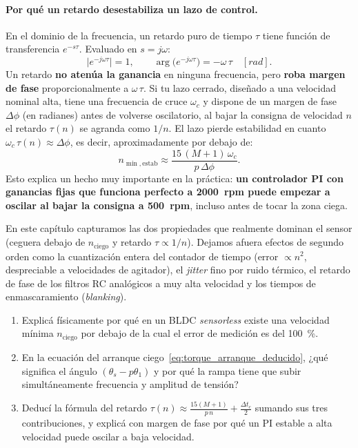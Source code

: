 \documentclass[11pt,a4paper,oneside]{book}
\begin{document}
\paragraph{Por qué un retardo desestabiliza un lazo de control.}
En el dominio de la frecuencia, un retardo puro de tiempo $\tau$ tiene función
de transferencia $e^{-s\tau}$. Evaluado en $s = j\omega$:
\[
  \big|e^{-j\omega\tau}\big| = 1,
  \qquad
  \arg\!\big(e^{-j\omega\tau}\big) = -\omega\,\tau \quad [\si{rad}].
\]
Un retardo \textbf{no atenúa la ganancia} en ninguna frecuencia, pero \textbf{roba
margen de fase} proporcionalmente a $\omega\,\tau$. Si tu lazo cerrado, diseñado
a una velocidad nominal alta, tiene una frecuencia de cruce $\omega_c$ y dispone
de un margen de fase $\Delta\phi$ (en radianes) antes de volverse oscilatorio,
al bajar la consigna de velocidad $n$ el retardo $\tau(n)$ se agranda como
$1/n$. El lazo pierde estabilidad en cuanto $\omega_c\,\tau(n) \approx \Delta\phi$,
es decir, aproximadamente por debajo de:
\begin{equation}
  n_{\min,\text{estab}} \approx \frac{15\,(M + 1)\,\omega_c}{p\,\Delta\phi}.
  \label{eq:n_min_estab}
\end{equation}
Esto explica un hecho muy importante en la práctica: \textbf{un controlador PI
con ganancias fijas que funciona perfecto a \SI{2000}{rpm} puede empezar a
oscilar al bajar la consigna a \SI{500}{rpm}}, incluso antes de tocar la zona
ciega.

\begin{antidoto}
En este capítulo capturamos las dos propiedades que realmente dominan el sensor
(ceguera debajo de $n_{\text{ciego}}$ y retardo $\tau \propto 1/n$). Dejamos
afuera efectos de segundo orden como la cuantización entera del contador de
tiempo (error $\propto n^2$, despreciable a velocidades de agitador), el
\emph{jitter} fino por ruido térmico, el retardo de fase de los filtros RC
analógicos a muy alta velocidad y los tiempos de enmascaramiento
(\emph{blanking}).
\end{antidoto}

\begin{lapizypapel}
\begin{enumerate}[leftmargin=1.5em]
  \item Explicá físicamente por qué en un BLDC \emph{sensorless} existe una
        velocidad mínima $n_{\text{ciego}}$ por debajo de la cual el error de
        medición es del \SI{100}{\percent}.
  \item En la ecuación del arranque ciego~\eqref{eq:torque_arranque_deducido},
        ¿qué significa el ángulo $(\theta_s - p\theta_1)$ y por qué la rampa
        tiene que subir simultáneamente frecuencia y amplitud de tensión?
  \item Deducí la fórmula del retardo $\tau(n) \approx \frac{15(M+1)}{p\,n} + \frac{\Delta t_c}{2}$
        sumando sus tres contribuciones, y explicá con margen de fase por qué un
        PI estable a alta velocidad puede oscilar a baja velocidad.
\end{enumerate}
\end{lapizypapel}
\end{document}
